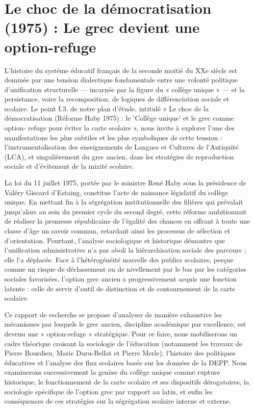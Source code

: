 

\section{Le choc de la démocratisation (1975) : Le grec devient une option-refuge}

L'histoire du système éducatif français de la seconde moitié du XXe siècle est dominée par une
tension dialectique fondamentale entre une volonté politique d'unification structurelle — incarnée
par la figure du « collège unique » — et la persistance, voire la recomposition, de logiques de
différenciation sociale et scolaire. Le point I.3.\cite{I-3-1-ref1} de notre plan d'étude, intitulé
« Le choc de la démocratisation (Réforme Haby 1975) : le 'Collège unique' et le grec comme option-
refuge pour éviter la carte scolaire », nous invite à explorer l'une des manifestations les plus
subtiles et les plus symboliques de cette tension : l'instrumentalisation des enseignements de
Langues et Cultures de l'Antiquité (LCA), et singulièrement du grec ancien, dans les stratégies de
reproduction sociale et d'évitement de la mixité scolaire.

La loi du 11 juillet 1975, portée par le ministre René Haby sous la présidence de Valéry Giscard
d'Estaing, constitue l'acte de naissance législatif du collège unique. En mettant fin à la
ségrégation institutionnelle des filières qui prévalait jusqu'alors au sein du premier cycle du
second degré, cette réforme ambitionnait de réaliser la promesse républicaine de l'égalité des
chances en offrant à toute une classe d'âge un savoir commun, retardant ainsi les processus de
sélection et d'orientation.\cite{I-3-1-ref1} Pourtant, l'analyse sociologique et historique démontre
que l'unification administrative n'a pas aboli la hiérarchisation sociale des parcours ; elle l'a
déplacée. Face à l'hétérogénéité nouvelle des publics scolaires, perçue comme un risque de
déclassement ou de nivellement par le bas par les catégories sociales favorisées, l'option grec
ancien a progressivement acquis une fonction latente : celle de servir d'outil de distinction et de
contournement de la carte scolaire.

Ce rapport de recherche se propose d'analyser de manière exhaustive les mécanismes par lesquels le
grec ancien, discipline académique par excellence, est devenu une « option-refuge » stratégique.
Pour ce faire, nous mobiliserons un cadre théorique croisant la sociologie de l'éducation (notamment
les travaux de Pierre Bourdieu, Marie Duru-Bellat et Pierre Merle), l'histoire des politiques
éducatives et l'analyse des flux scolaires basée sur les données de la DEPP. Nous examinerons
successivement la genèse du collège unique comme rupture historique, le fonctionnement de la carte
scolaire et ses dispositifs dérogatoires, la sociologie spécifique de l'option grec par rapport au
latin, et enfin les conséquences de ces stratégies sur la ségrégation scolaire interne et externe.



